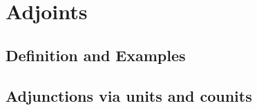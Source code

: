 \chapter{Adjoints}



\section{Definition and Examples}
\addtocounter{subsection}{11}










\section{Adjunctions via units and counits}
\addtocounter{subsection}{9}




